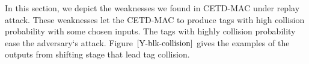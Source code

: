 \documentclass{article}
\begin{document}
In this section, we depict the weaknesses we found in CETD-MAC under replay attack. These weaknesses let the CETD-MAC to produce tags with high collision probability with some chosen inputs. The tags with highly collision probability ease the adversary`s attack. Figure $\ref{Y-blk-collision}$ gives the examples of the outputs from shifting stage that lead tag collision.
\begin{figure}
\centering
{}
\end{figure}
\end{document}
